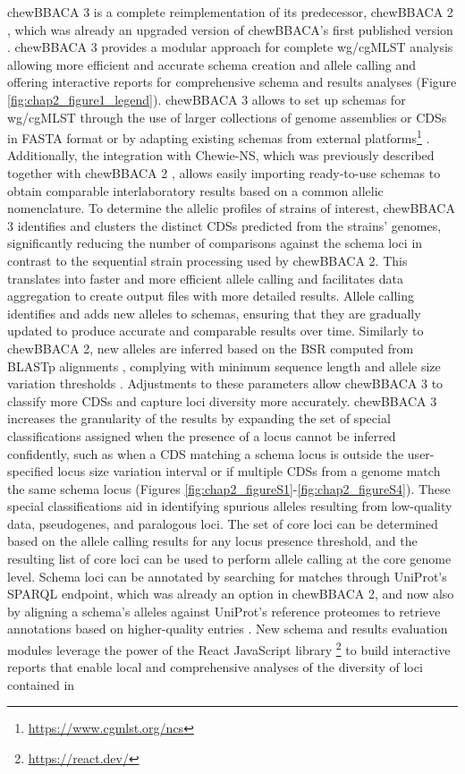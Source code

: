 chewBBACA 3 is a complete reimplementation of its predecessor, chewBBACA 2 \citep{mamede_chewie_2021}, which was already an upgraded version of chewBBACA’s first published version \citep{silva_chewbbaca_2018}. chewBBACA 3 provides a modular approach for complete \ac{wg/cgMLST} analysis allowing more efficient and accurate schema creation and allele calling and offering interactive reports for comprehensive schema and results analyses (Figure \ref{fig:chap2_figure1_legend}). chewBBACA 3 allows to set up schemas for \ac{wg/cgMLST} through the use of larger collections of genome assemblies or \acp{CDS} in FASTA format or by adapting existing schemas from external platforms\footnote{\url{https://www.cgmlst.org/ncs}} \citep{jolley_bigsdb_2010, zhou_enterobase_2020}. Additionally, the integration with Chewie-NS, which was previously described together with chewBBACA 2 \citep{mamede_chewie_2021}, allows easily importing ready-to-use schemas to obtain comparable interlaboratory results based on a common allelic nomenclature. To determine the allelic profiles of strains of interest, chewBBACA 3 identifies and clusters the distinct CDSs predicted from the strains' genomes, significantly reducing the number of comparisons against the schema loci in contrast to the sequential strain processing used by chewBBACA 2. This translates into faster and more efficient allele calling and facilitates data aggregation to create output files with more detailed results. Allele calling identifies and adds new alleles to schemas, ensuring that they are gradually updated to produce accurate and comparable results over time. Similarly to chewBBACA 2, new alleles are inferred based on the \ac{BSR} \citep{rasko_visualization_2005} computed from \ac{BLASTp} alignments \citep{camacho_blast_2009}, complying with minimum sequence length and allele size variation thresholds \citep{silva_chewbbaca_2018}. Adjustments to these parameters allow chewBBACA 3 to classify more \acp{CDS} and capture loci diversity more accurately. chewBBACA 3 increases the granularity of the results by expanding the set of special classifications assigned when the presence of a locus cannot be inferred confidently, such as when a \ac{CDS} matching a schema locus is outside the user-specified locus size variation interval or if multiple \acp{CDS} from a genome match the same schema locus (Figures \ref{fig:chap2_figureS1}-\ref{fig:chap2_figureS4}). These special classifications aid in identifying spurious alleles resulting from low-quality data, pseudogenes, and paralogous loci. The set of core loci can be determined based on the allele calling results for any locus presence threshold, and the resulting list of core loci can be used to perform allele calling at the core genome level. Schema loci can be annotated by searching for matches through UniProt’s \ac{SPARQL} endpoint, which was already an option in chewBBACA 2, and now also by aligning a schema’s alleles against UniProt’s reference proteomes to retrieve annotations based on higher-quality entries \citep{the_uniprot_consortium_uniprot_2025}. New schema and results evaluation modules leverage the power of the React JavaScript library \footnote{\url{https://react.dev/}} to build interactive reports that enable local and comprehensive analyses of the diversity of loci contained in 